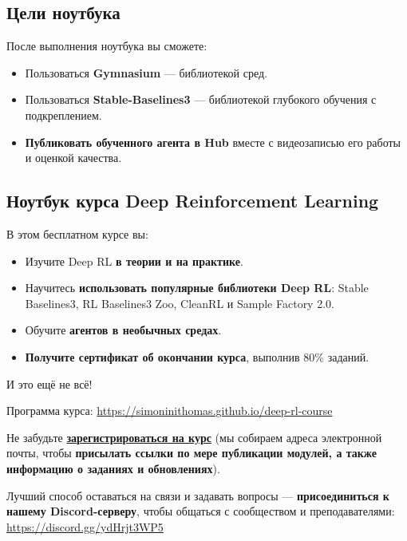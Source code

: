\documentclass[11pt,a4paper]{article}
\begin{document}
\subsection{Цели ноутбука}\label{objectives-of-this-notebook}

После выполнения ноутбука вы сможете:

\begin{itemize}
\tightlist
\item
  Пользоваться \textbf{Gymnasium} --- библиотекой сред.
\item
  Пользоваться \textbf{Stable-Baselines3} --- библиотекой глубокого обучения с подкреплением.
\item
  \textbf{Публиковать обученного агента в Hub} вместе с видеозаписью его работы и оценкой качества.
\end{itemize}

\subsection{Ноутбук курса Deep Reinforcement Learning}\label{this-notebook-is-from-deep-reinforcement-learning-course}


В этом бесплатном курсе вы:

\begin{itemize}
\tightlist
\item
  Изучите Deep RL \textbf{в теории и на практике}.
\item
  Научитесь \textbf{использовать популярные библиотеки Deep RL}: Stable Baselines3, RL Baselines3 Zoo, CleanRL и Sample Factory 2.0.
\item
  Обучите \textbf{агентов в необычных средах}.
\item
  \textbf{Получите сертификат об окончании курса}, выполнив 80\% заданий.
\end{itemize}

И это ещё не всё!

Программа курса: \url{https://simoninithomas.github.io/deep-rl-course}

Не забудьте \textbf{\href{http://eepurl.com/ic5ZUD}{зарегистрироваться на курс}} (мы собираем адреса электронной почты, чтобы \textbf{присылать ссылки по мере публикации модулей, а также информацию о заданиях и обновлениях}).

Лучший способ оставаться на связи и задавать вопросы --- \textbf{присоединиться к нашему Discord-серверу}, чтобы общаться с сообществом и преподавателями: \url{https://discord.gg/ydHrjt3WP5}
\end{document}
